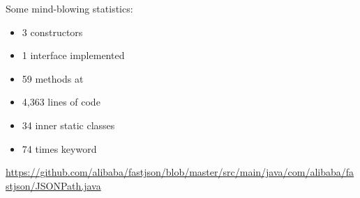 \documentclass{article}
\begin{document}
\begin{pptWide}{2}
\par
{}\par
\par\columnbreak\par
Some mind-blowing statistics:
\begin{itemize}
  \item 3 constructors
  \item 1 interface implemented
  \item 59 methods at 
  \item 4,363 lines of code
  \item 34 inner static classes
  \item 74 times  keyword
\end{itemize}
\end{pptWide}
\par
{\tiny \url{https://github.com/alibaba/fastjson/blob/master/src/main/java/com/alibaba/fastjson/JSONPath.java}\par}
\plush{}
\end{document}
